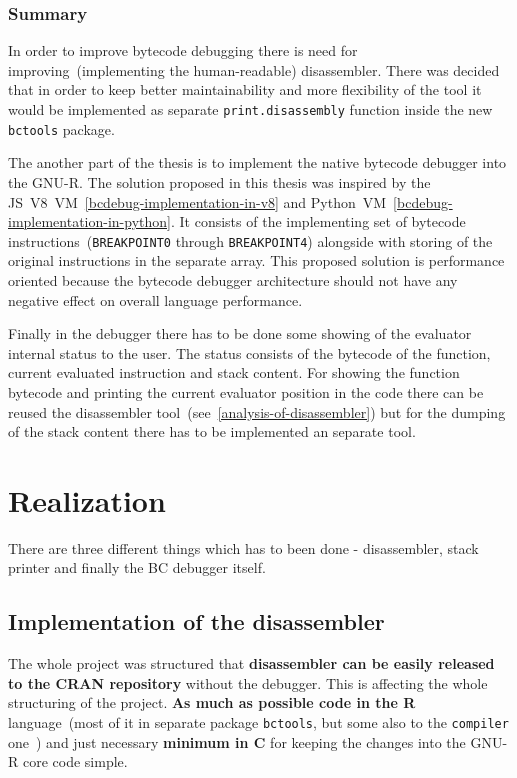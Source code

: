 \documentclass[thesis=M,english]{FITthesis}[2018/10/20]
\newcommand{\code}[1]{\texttt{#1}}
\begin{document}
\subsection{Summary}

In order to improve bytecode debugging there is need for improving~(implementing the human-readable) disassembler. There was decided that in order to keep better maintainability and more flexibility of the tool it would be implemented as separate \code{print.disassembly} function inside the new \code{bctools} package.

The another part of the thesis is to implement the native bytecode debugger into the GNU-R. The solution proposed in this thesis was inspired by the JS~V8~VM~\ref{bcdebug-implementation-in-v8} and Python~VM~\ref{bcdebug-implementation-in-python}. It consists of the implementing set of bytecode instructions~(\code{BREAKPOINT0} through \code{BREAKPOINT4}) alongside with storing of the original instructions in the separate array. This proposed solution is performance oriented because the bytecode debugger architecture should not have any negative effect on overall language performance.

Finally in the debugger there has to be done some showing of the evaluator internal status to the user. The status consists of the bytecode of the function, current evaluated instruction and stack content. For showing the function bytecode and printing the current evaluator position in the code there can be reused the disassembler tool~(see~\ref{analysis-of-disassembler}) but for the dumping of the stack content there has to be implemented an separate tool.

\chapter{Realization}

There are three different things which has to been done - disassembler, stack printer and finally the BC debugger itself. 

\section{Implementation of the disassembler}\label{implementation-of-disassembler}

The whole project was structured that \textbf{disassembler can be easily released to the CRAN repository} without the debugger. This is affecting the whole structuring of the project. \textbf{As much as possible code in the R} language~(most of it in separate package \code{bctools}, but some also to the \code{compiler} one~\label{internal-parts-of-vm}) and just necessary \textbf{minimum in C} for keeping the changes into the GNU-R core code simple.
\end{document}
